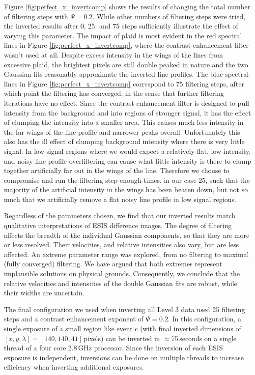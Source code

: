 Figure \ref{fig:perfect_x_invertcomp} shows the results of changing the total number of filtering steps with $\Psi=0.2$.
While other numbers of filtering steps were tried, the inverted results after 0, 25, and 75 steps sufficiently illustrate the effect of varying this parameter. 
The impact of plaid is most evident in the red spectral lines in Figure \ref{fig:perfect_x_invertcomp}, where the contrast enhancement filter wasn't used at all.
Despite excess intensity in the wings of the lines from excessive plaid, the brightest pixels are still double peaked in nature and the two Gaussian fits reasonably approximate the inverted line profiles.
The blue spectral lines in Figure \ref{fig:perfect_x_invertcomp} correspond to 75 filtering steps, after which point the filtering has converged, in the sense that further filtering iterations have no effect.
Since the contrast enhancement filter is designed to pull intensity from the background and into regions of stronger signal, it has the effect of clumping the intensity into a smaller area.
This causes much less intensity in the far wings of the line profile and narrower peaks overall.  
Unfortunately this also has the ill effect of clumping background intensity where there is very little signal.
In low signal regions where we would expect a relatively flat, low intensity, and noisy line profile overfiltering can cause what little intensity is there to clump together artificially far out in the wings of the line.
Therefore we choose to compromise and run the filtering step enough times, in our case 25, such that the majority of the artificial intensity in the wings has been beaten down, but not so much that we artificially remove a flat noisy line profile in low signal regions. 

Regardless of the parameters chosen, we find that our inverted results match qualitative interpretations of ESIS difference images.
The degree of filtering affects the breadth of the individual Gaussian components, so that they are more or less resolved. 
Their velocities, and relative intensities also vary, but are less affected. 
An extreme parameter range was explored, from no filtering to maximal (fully converged) filtering. 
We have argued that both extremes represent implausible solutions on physical grounds. Consequently, we conclude that the relative velocities and intensities of the double Gaussian fits are robust, while their widths are uncertain. 

The final configuration we used when inverting all Level 3 data used 25 filtering steps and a contrast enhancement exponent of $\Psi=0.2$.
In this configuration, a single exposure of a small region like event c (with final inverted dimensions of $[x,y,\lambda] = [140,140,41]$\,pixels) can be inverted in $\approx$75\,seconds on a single thread of a four core 2.8\,GHz processor.
Since the inversion of each ESIS exposure is independent, inversions can be done on multiple threads to increase efficiency when inverting additional exposures.